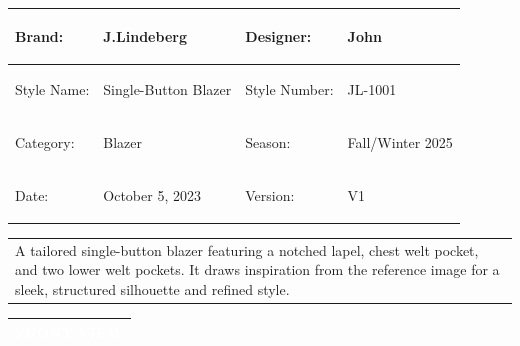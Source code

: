 \documentclass[landscape]{article}
\newcommand{\techsection}[1]{%
\noindent\begin{tabularx}{\textwidth}{|X|}
\hline
\cellcolor{primaryblue}\textcolor{white}{\large\textbf{#1}} \\
\hline
\end{tabularx}
\vspace{0.1cm}
}
\begin{document}
\begin{center}
\end{center}

\vspace{0.5cm}

\begin{center}
\begin{tabular}{|>{\bfseries\raggedright\arraybackslash}p{3cm}|p{4cm}|>{\bfseries\raggedright\arraybackslash}p{3cm}|p{4cm}|}
\hline
\rowcolor{tablehead}Brand: & J.Lindeberg & \rowcolor{tablehead}Designer: & John \\
\hline
Style Name: & Single-Button Blazer & Style Number: & JL-1001 \\
\hline
\rowcolor{tablehead}Category: & Blazer & \rowcolor{tablehead}Season: & Fall/Winter 2025 \\
\hline
Date: & October 5, 2023 & Version: & V1 \\
\hline
\end{tabular}
\end{center}

\vspace{0.5cm}

\begin{center}
\begin{tabular}{|p{14cm}|}
\hline
\rowcolor{tablehead}\multicolumn{1}{|c|}{\textbf{PRODUCT DESCRIPTION}} \\
\hline
\vspace{0.2cm}
\large A tailored single-button blazer featuring a notched lapel, chest welt pocket, and two lower welt pockets. It draws inspiration from the reference image for a sleek, structured silhouette and refined style.
\vspace{0.3cm} \\
\hline
\end{tabular}
\end{center}

\newpage

\techsection{FRONT VIEW}
\vspace{-0.3cm}
\end{document}
